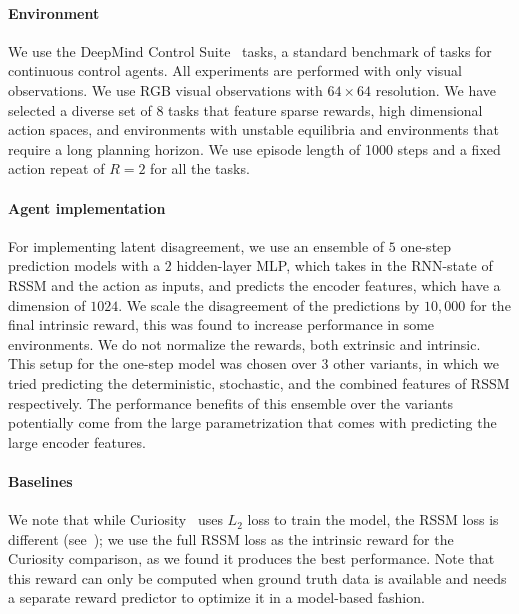 \documentclass{article}
\begin{document}
\paragraph{Environment}
We use the DeepMind Control Suite~\cite{deepmindcontrolsuite2018} tasks, a standard benchmark of tasks for continuous control agents. All experiments are performed with only visual observations. We use RGB visual observations with $64 \times 64$ resolution. We have selected a diverse set of 8 tasks that feature sparse rewards, high dimensional action spaces, and environments with unstable equilibria and environments that require a long planning horizon. We use episode length of 1000 steps and a fixed action repeat of $R=2$ for all the tasks.
%
%
%

\paragraph{Agent implementation}
%
For implementing latent disagreement, we use an ensemble of $5$ one-step prediction models with a $2$ hidden-layer MLP, which takes in the RNN-state of RSSM and the action as inputs, and predicts the encoder features, which have a dimension of $1024$. We scale the disagreement of the predictions by $10,000$ for the final intrinsic reward, this was found to increase performance in some environments. We do not normalize the rewards, both extrinsic and intrinsic. This setup for the one-step model was chosen over $3$ other variants, in which we tried predicting the deterministic, stochastic, and the combined features of RSSM respectively. The performance benefits of this ensemble over the variants potentially come from the large parametrization that comes with predicting the large encoder features.

%

\paragraph{Baselines}
We note that while Curiosity~\cite{pathakICMl17curiosity} uses $L_2$ loss to train the model, the RSSM loss is different (see~\cite{hafner2018planet}); we use the full RSSM loss as the intrinsic reward for the Curiosity comparison, as we found it produces the best performance. Note that this reward can only be computed when ground truth data is available and needs a separate reward predictor to optimize it in a model-based fashion. %
\end{document}
